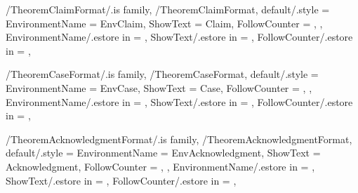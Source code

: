 
\pgfkeys
{
  /TheoremClaimFormat/.is family, /TheoremClaimFormat,
  default/.style =
  {
    EnvironmentName = {EnvClaim},
    ShowText = {Claim},
    FollowCounter = \empty,
  },
  EnvironmentName/.estore in = \GetTheoremClaimFormatEnvironmentName,
  ShowText/.estore in = \GetTheoremClaimFormatShowText,
  FollowCounter/.estore in = \GetTheoremClaimFormatFollowCounter,
} %

\newcommand{\InsertClaim}[1]
{%
  \InsertTheoremContent[\empty]{%
    \GetTheoremClaimFormatEnvironmentName}{#1}%
} %

\newcommand{\InitTheoremClaimFormat}
{%
  \theoremstyle{definition}%
  \ifthenelse{\equal{\GetTheoremClaimFormatFollowCounter}{\empty}}%
  {%
    \newtheorem*{%
      \GetTheoremClaimFormatEnvironmentName}{%
      \GetTheoremClaimFormatShowText}
  }%
  {%
    \newtheorem{%
      \GetTheoremClaimFormatEnvironmentName}{%
      \GetTheoremClaimFormatShowText}[%
      \GetTheoremClaimFormatFollowCounter]%
  }%
} %


\pgfkeys
{
  /TheoremCaseFormat/.is family, /TheoremCaseFormat,
  default/.style =
  {
    EnvironmentName = {EnvCase},
    ShowText = {Case},
    FollowCounter = \empty,
  },
  EnvironmentName/.estore in = \GetTheoremCaseFormatEnvironmentName,
  ShowText/.estore in = \GetTheoremCaseFormatShowText,
  FollowCounter/.estore in = \GetTheoremCaseFormatFollowCounter,
} %

\newcommand{\InsertCase}[1]
{%
  \InsertTheoremContent[\empty]{%
    \GetTheoremCaseFormatEnvironmentName}{#1}%
} %

\newcommand{\InitTheoremCaseFormat}
{%
  \theoremstyle{definition}%
  \ifthenelse{\equal{\GetTheoremCaseFormatFollowCounter}{\empty}}%
  {%
    \newtheorem*{%
      \GetTheoremCaseFormatEnvironmentName}{%
      \GetTheoremCaseFormatShowText}
  }%
  {%
    \newtheorem{%
      \GetTheoremCaseFormatEnvironmentName}{%
      \GetTheoremCaseFormatShowText}[%
      \GetTheoremCaseFormatFollowCounter]%
  }%
} %


\pgfkeys
{
  /TheoremAcknowledgmentFormat/.is family, /TheoremAcknowledgmentFormat,
  default/.style =
  {
    EnvironmentName = {EnvAcknowledgment},
    ShowText = {Acknowledgment},
    FollowCounter = \empty,
  },
  EnvironmentName/.estore in = \GetTheoremAcknowledgmentFormatEnvironmentName,
  ShowText/.estore in = \GetTheoremAcknowledgmentFormatShowText,
  FollowCounter/.estore in = \GetTheoremAcknowledgmentFormatFollowCounter,
} %


